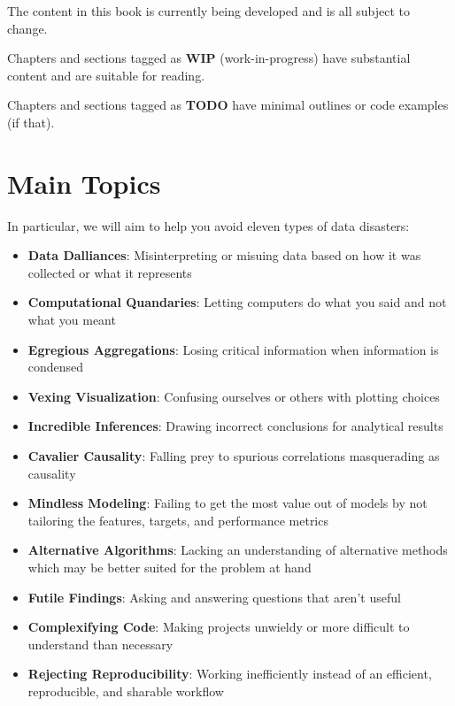 \documentclass[
]{krantz}
\providecommand{\tightlist}{%
  \setlength{\itemsep}{0pt}\setlength{\parskip}{0pt}}
\begin{document}
The content in this book is currently being developed and is all subject to change.

Chapters and sections tagged as \textbf{WIP} (work-in-progress) have substantial content and are suitable for reading.

Chapters and sections tagged as \textbf{TODO} have minimal outlines or code examples (if that).

\hypertarget{main-topics}{%
\section{Main Topics}\label{main-topics}}

In particular, we will aim to help you avoid eleven types of data disasters:

\begin{itemize}
\tightlist
\item
  \textbf{Data Dalliances}: Misinterpreting or misuing data based on how it was collected or what it represents
\item
  \textbf{Computational Quandaries}: Letting computers do what you said and not what you meant
\item
  \textbf{Egregious Aggregations}: Losing critical information when information is condensed
\item
  \textbf{Vexing Visualization}: Confusing ourselves or others with plotting choices
\item
  \textbf{Incredible Inferences}: Drawing incorrect conclusions for analytical results
\item
  \textbf{Cavalier Causality}: Falling prey to spurious correlations masquerading as causality
\item
  \textbf{Mindless Modeling}: Failing to get the most value out of models by not tailoring the features, targets, and performance metrics
\item
  \textbf{Alternative Algorithms}: Lacking an understanding of alternative methods which may be better suited for the problem at hand
\item
  \textbf{Futile Findings}: Asking and answering questions that aren't useful
\item
  \textbf{Complexifying Code}: Making projects unwieldy or more difficult to understand than necessary
\item
  \textbf{Rejecting Reproducibility}: Working inefficiently instead of an efficient, reproducible, and sharable workflow
\end{itemize}
\end{document}
